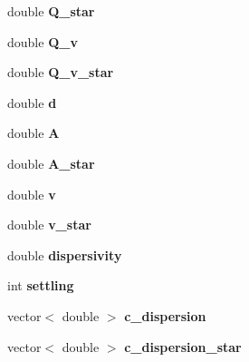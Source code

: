 \begin{DoxyCompactItemize}
\mbox{\label{class_c_connection_a078a3c40ce0c04104d36d6205f67a632}} 
double {\bfseries Q\+\_\+star}
\item 
\mbox{\label{class_c_connection_ac4c225e8b5546cd97b8c79fccf0fd375}} 
double {\bfseries Q\+\_\+v}
\item 
\mbox{\label{class_c_connection_aa5dc0dbcc47afc31621b1a944ac77337}} 
double {\bfseries Q\+\_\+v\+\_\+star}
\item 
\mbox{\label{class_c_connection_aa0e75f4d484fe8df0c168671a1e7863c}} 
double {\bfseries d}
\item 
\mbox{\label{class_c_connection_acf3320bb67c5d0fde38c210e0b05a239}} 
double {\bfseries A}
\item 
\mbox{\label{class_c_connection_ab62f992c7885ce0b55738ff770bdf408}} 
double {\bfseries A\+\_\+star}
\item 
\mbox{\label{class_c_connection_acaf179f97c3b6412072f6a58616c5caa}} 
double {\bfseries v}
\item 
\mbox{\label{class_c_connection_a844e52f157e66c9d043e942cc7480cfc}} 
double {\bfseries v\+\_\+star}
\item 
\mbox{\label{class_c_connection_a7bb7f8099c1f23d84449eba06009bdaf}} 
double {\bfseries dispersivity}
\item 
\mbox{\label{class_c_connection_a9f5e8379599a4cbba6a08a9f1e436b85}} 
int {\bfseries settling}
\item 
\mbox{\label{class_c_connection_a2baac48a6995efdc032f13fe884454bf}} 
vector$<$ double $>$ {\bfseries c\+\_\+dispersion}
\item 
\mbox{\label{class_c_connection_a0c14800fa335602b0d422c9d5ca46276}} 
vector$<$ double $>$ {\bfseries c\+\_\+dispersion\+\_\+star}
\item 
\mbox{\label{class_c_connection_aa07db6eb206851890200d9c45a1e0f20}} 

\end{DoxyCompactItemize}
